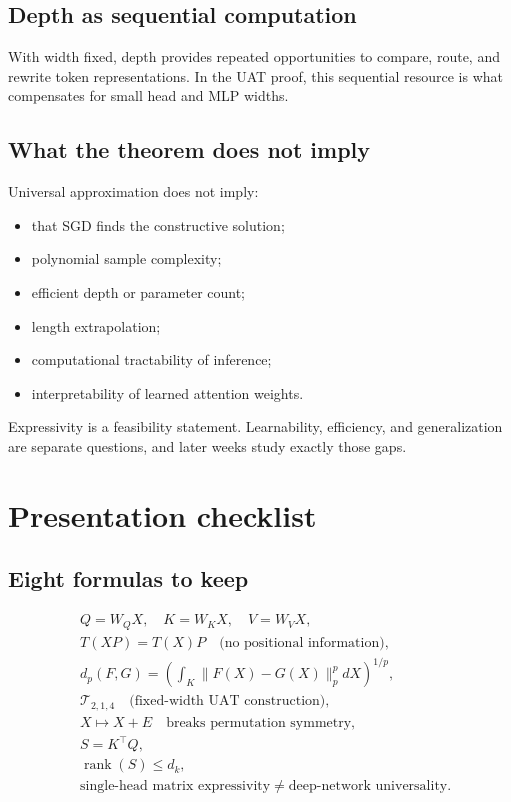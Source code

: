 \documentclass[11pt,a4paper,oneside,openany]{memoir}
\DeclareMathOperator{\rank}{rank}
\theoremstyle{definition}
\begin{document}
\section{Depth as sequential computation}
With width fixed, depth provides repeated opportunities to compare, route, and rewrite token representations.  In the UAT proof, this sequential resource is what compensates for small head and MLP widths.

\section{What the theorem does not imply}
Universal approximation does not imply:
\begin{itemize}
\item that SGD finds the constructive solution;
\item polynomial sample complexity;
\item efficient depth or parameter count;
\item length extrapolation;
\item computational tractability of inference;
\item interpretability of learned attention weights.
\end{itemize}

\begin{presentbox}
Expressivity is a feasibility statement.  Learnability, efficiency, and generalization are separate questions, and later weeks study exactly those gaps.
\end{presentbox}

\chapter{Presentation checklist}
\section{Eight formulas to keep}
\begin{align*}
&Q=W_QX,\quad K=W_KX,\quad V=W_VX,\\
&T(XP)=T(X)P\quad\text{(no positional information)},\\
&d_p(F,G)=\left(\int_K\|F(X)-G(X)\|_p^p dX\right)^{1/p},\\
&\mathcal T_{2,1,4}\quad\text{(fixed-width UAT construction)},\\
&X\mapsto X+E\quad\text{breaks permutation symmetry},\\
&S=K^\top Q,\\
&\rank(S)\le d_k,\\
&\text{single-head matrix expressivity}\neq\text{deep-network universality}.
\end{align*}
\end{document}
